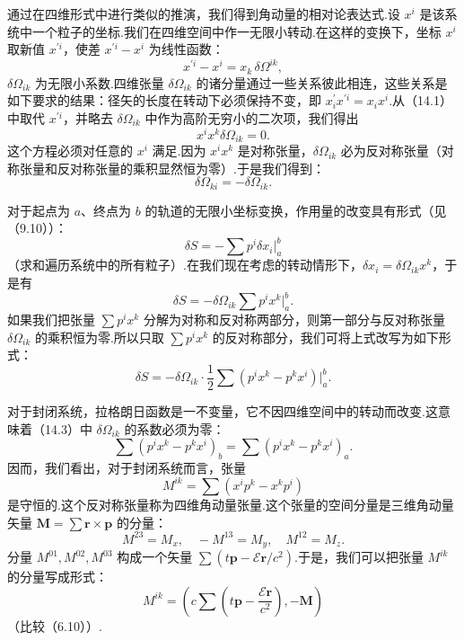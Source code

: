 通过在四维形式中进行类似的推演，我们得到角动量的相对论表达式.设 $x^i$ 是该系统中一个粒子的坐标.我们在四维空间中作一无限小转动.在这样的变换下，坐标 $x^i$ 取新值 $x^{\prime i}$，使差 $x^{\prime i}-x^i$ 为线性函数：
\begin{equation}
  x^{\prime i}-x^i=x_k\,\delta\Omega^{ik},
\end{equation}
$\delta\Omega_{ik}$ 为无限小系数.四维张量 $\delta\Omega_{ik}$ 的诸分量通过一些关系彼此相连，这些关系是如下要求的结果：径矢的长度在转动下必须保持不变，即 $x_i^{\prime}x^{\prime i}=x_ix^i$.从（14.1）中取代 $x^{\prime i}$，并略去 $\delta\Omega_{ik}$ 中作为高阶无穷小的二次项，我们得出
\begin{equation*}
  x^ix^k\delta\Omega_{ik}=0.
\end{equation*}
这个方程必须对任意的 $x^i$ 满足.因为 $x^ix^k$ 是对称张量，$\delta\Omega_{ik}$ 必为反对称张量（对称张量和反对称张量的乘积显然恒为零）.于是我们得到：
\begin{equation}
  \delta\Omega_{ki}=-\delta\Omega_{ik}.
\end{equation}

对于起点为 $a$、终点为 $b$ 的轨道的无限小坐标变换，作用量的改变具有形式（见（9.10））：
\begin{equation*}
  \delta S=-\sum p^i\delta x_i\Big|_a^b
\end{equation*}
（求和遍历系统中的所有粒子）.在我们现在考虑的转动情形下，$\delta x_i=\delta\Omega_{ik}x^k$，于是有
\begin{equation*}
  \delta S=-\delta\Omega_{ik}\sum p^ix^k\Big|_a^b.
\end{equation*}
如果我们把张量 $\sum p^ix^k$ 分解为对称和反对称两部分，则第一部分与反对称张量 $\delta\Omega_{ik}$ 的乘积恒为零.所以只取 $\sum p^ix^k$ 的反对称部分，我们可将上式改写为如下形式：
\begin{equation}
  \delta S=-\delta\Omega_{ik}\cdot\frac{1}{2}
  \sum(p^ix^k-p^kx^i)\Big|_a^b.
\end{equation}

对于封闭系统，拉格朗日函数是一不变量，它不因四维空间中的转动而改变.这意味着（14.3）中 $\delta\Omega_{ik}$ 的系数必须为零：
\begin{equation*}
  \sum(p^ix^k-p^kx^i)_b=\sum(p^ix^k-p^kx^i)_a.
\end{equation*}
因而，我们看出，对于封闭系统而言，张量
\begin{equation}
  M^{ik}=\sum(x^ip^k-x^kp^i)
\end{equation}
是守恒的.这个反对称张量称为四维角动量张量.这个张量的空间分量是三维角动量矢量 $\boldsymbol{M}=\sum\boldsymbol{r}\times\boldsymbol{p}$ 的分量：
\begin{equation*}
  M^{23}=M_x,\quad -M^{13}=M_y,\quad M^{12}=M_z.
\end{equation*}
分量 $M^{01},M^{02},M^{03}$ 构成一个矢量 $\sum\left(t\boldsymbol{p}-\mathcal{E}\boldsymbol{r}/c^2\right)$.于是，我们可以把张量 $M^{ik}$ 的分量写成形式：
\begin{equation}
  M^{ik}=\left(c\sum\left(t\boldsymbol{p}-\frac{\mathcal{E}\boldsymbol{r}}{c^2}\right),
  -\boldsymbol{M}\right)
\end{equation}
（比较（6.10））.

